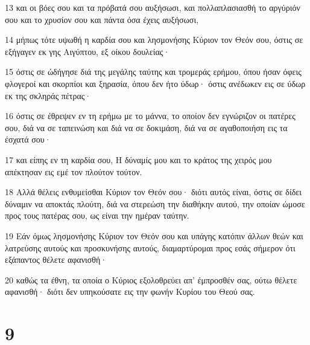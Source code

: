 \par 13 και οι βόες σου και τα πρόβατά σου αυξήσωσι, και πολλαπλασιασθή το αργύριόν σου και το χρυσίον σου και πάντα όσα έχεις αυξήσωσι,
\par 14 μήπως τότε υψωθή η καρδία σου και λησμονήσης Κύριον τον Θεόν σου, όστις σε εξήγαγεν εκ γης Αιγύπτου, εξ οίκου δουλείας·
\par 15 όστις σε ώδήγησε διά της μεγάλης ταύτης και τρομεράς ερήμου, όπου ήσαν όφεις φλογεροί και σκορπίοι και ξηρασία, όπου δεν ήτο ύδωρ· όστις ανέδωκεν εις σε ύδωρ εκ της σκληράς πέτρας·
\par 16 όστις σε έθρεψεν εν τη ερήμω με το μάννα, το οποίον δεν εγνώριζον οι πατέρες σου, διά να σε ταπεινώση και διά να σε δοκιμάση, διά να σε αγαθοποιήση εις τα έσχατά σου·
\par 17 και είπης εν τη καρδία σου, Η δύναμίς μου και το κράτος της χειρός μου απέκτησαν εις εμέ τον πλούτον τούτον.
\par 18 Αλλά θέλεις ενθυμείσθαι Κύριον τον Θεόν σου· διότι αυτός είναι, όστις σε δίδει δύναμιν να αποκτάς πλούτη, διά να στερεώση την διαθήκην αυτού, την οποίαν ώμοσε προς τους πατέρας σου, ως είναι την ημέραν ταύτην.
\par 19 Εάν όμως λησμονήσης Κύριον τον Θεόν σου και υπάγης κατόπιν άλλων θεών και λατρεύσης αυτούς και προσκυνήσης αυτούς, διαμαρτύρομαι προς εσάς σήμερον ότι εξάπαντος θέλετε αφανισθή·
\par 20 καθώς τα έθνη, τα οποία ο Κύριος εξολοθρεύει απ' έμπροσθέν σας, ούτω θέλετε αφανισθή· διότι δεν υπηκούσατε εις την φωνήν Κυρίου του Θεού σας.

\chapter{9}


